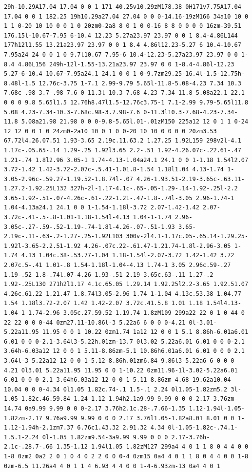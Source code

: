 \documentclass[11pt]{article}
\begin{document}
\begin{enumerate}
\begin{verbatim}
29h-10.29A17.04 17.04 0 0 1 171 40.25v10.29zM178.38 0H171v7.75A17.04 17.04 0 0 1 182.25 19h10.29a27.04 27.04 0 0 0-14.16-19zM166 34a10 10 0 1 1 0-20 10 10 0 0 1 0 20zm0-2a8 8 0 1 0 0-16 8 8 0 0 0 0 16zm-39.51 176.15l-10.67-7.95 6-10.4 12.23 5.27a23.97 23.97 0 0 1 8.4-4.86L144 177h12l1.55 13.21a23.97 23.97 0 0 1 8.4 4.86l12.23-5.27 6 10.4-10.67 7.95a24 24 0 0 1 0 9.7l10.67 7.95-6 10.4-12.23-5.27a23.97 23.97 0 0 1-8.4 4.86L156 249h-12l-1.55-13.21a23.97 23.97 0 0 1-8.4-4.86l-12.23 5.27-6-10.4 10.67-7.95a24.1 24.1 0 0 1 0-9.7zm29.25-16.4l-1.5-12.75h-8.48l-1.5 12.76c-3.75 1-7.1 2.99-9.79 5.65l-11.8-5.08-4.23 7.34 10.3 7.68c-.98 3.7-.98 7.6 0 11.3l-10.3 7.68 4.23 7.34 11.8-5.08a22.1 22.1 0 0 0 9.8 5.65l1.5 12.76h8.47l1.5-12.76c3.75-1 7.1-2.99 9.79-5.65l11.8 5.08 4.23-7.34-10.3-7.68c.98-3.7.98-7.6 0-11.3l10.3-7.68-4.23-7.34-11.8 5.08a21.98 21.98 0 0 0-9.8-5.65l.01-.01zM150 225a12 12 0 1 1 0-24 12 12 0 0 1 0 24zm0-2a10 10 0 1 0 0-20 10 10 0 0 0 0 20zm3.53 67.72l4.26.07.51 1.93-3.65 2.19c.11.63.2 1.27.25 1.92L159 298v2l-4.1 1.17c-.05.65-.14 1.29-.25 1.92l3.65 2.2-.51 1.92-4.26.07c-.22.61-.47 1.21-.74 1.8l2.96 3.05-1 1.74-4.13-1.04a24.1 24.1 0 0 1-1.18 1.54l2.07 3.72-1.42 1.42-3.72-2.07c-.5.41-1.01.8-1.54 1.18l1.04 4.13-1.74 1-3.05-2.96c-.59.27-1.19.52-1.8.74l-.07 4.26-1.93.51-2.19-3.65c-.63.11-1.27.2-1.92.25L132 327h-2l-1.17-4.1c-.65-.05-1.29-.14-1.92-.25l-2.2 3.65-1.92-.51-.07-4.26c-.61-.22-1.21-.47-1.8-.74l-3.05 2.96-1.74-1 1.04-4.13a24.1 24.1 0 0 1-1.54-1.18l-3.72 2.07-1.42-1.42 2.07-3.72c-.41-.5-.8-1.01-1.18-1.54l-4.13 1.04-1-1.74 2.96-3.05c-.27-.59-.52-1.19-.74-1.8l-4.26-.07-.51-1.93 3.65-2.19c-.11-.63-.2-1.27-.25-1.92L103 300v-2l4.1-1.17c.05-.65.14-1.29.25-1.92l-3.65-2.2.51-1.92 4.26-.07c.22-.61.47-1.21.74-1.8l-2.96-3.05 1-1.74 4.13 1.04c.38-.53.77-1.04 1.18-1.54l-2.07-3.72 1.42-1.42 3.72 2.07c.5-.41 1.01-.8 1.54-1.18l-1.04-4.13 1.74-1 3.05 2.96c.59-.27 1.19-.52 1.8-.74l.07-4.26 1.93-.51 2.19 3.65c.63-.11 1.27-.2 1.92-.25L130 271h2l1.17 4.1c.65.05 1.29.14 1.92.25l2.2-3.65 1.92.51.07 4.26c.61.22 1.21.47 1.8.74l3.05-2.96 1.74 1-1.04 4.13c.53.38 1.04.77 1.54 1.18l3.72-2.07 1.42 1.42-2.07 3.72c.41.5.8 1.01 1.18 1.54l4.13-1.04 1 1.74-2.96 3.05c.27.59.52 1.19.74 1.8zM109 299a22 22 0 1 0 44 0 22 22 0 0 0-44 0zm27.11-10.86l-3 5.22a6 6 0 0 0-4.21 0l-3.01-5.22a11.95 11.95 0 0 1 10.22 0zm1.74 1a12 12 0 0 1 5.1 8.86h-6.01a6.01 6.01 0 0 0-2.1-3.64l3-5.22h.01zm-13.7 0l3.02 5.22a6.01 6.01 0 0 0-2.1 3.64h-6.03a12 12 0 0 1 5.11-8.86zm-5.1 10.86h6.01a6.01 6.01 0 0 0 2.1 3.64l-3 5.22a12 12 0 0 1-5.12-8.86h.01zm6.84 9.86l3-5.22a6 6 0 0 0 4.21 0l3.01 5.22a11.95 11.95 0 0 1-10.22 0zm11.96-1l-3.02-5.22a6.01 6.01 0 0 0 2.1-3.64h6.03a12 12 0 0 1-5.11 8.86zm-4.68-19.62a10.04 10.04 0 0 0-4.34 0l1.05 1.82c.74-.1 1.5-.1 2.24 0l1.05-1.82zm5.2 3l-1.05 1.82c.46.59.84 1.24 1.12 1.94h2.1a9.99 9.99 0 0 0-2.17-3.76zm-14.74 0a9.99 9.99 0 0 0-2.17 3.76h2.1c.28-.7.66-1.35 1.12-1.94l-1.05-1.82zm-2.17 9.76a9.99 9.99 0 0 0 2.17 3.76l1.05-1.82a8.01 8.01 0 0 1-1.12-1.94h-2.1zm7.37 6.76c1.43.32 2.91.32 4.34 0l-1.05-1.82c-.74.1-1.5.1-2.24 0l-1.05 1.82zm9.54-3a9.99 9.99 0 0 0 2.17-3.76h-2.1c-.28.7-.66 1.35-1.12 1.94l1.05 1.82zM127 299a4 4 0 1 1 8 0 4 4 0 0 1-8 0zm2 0a2 2 0 1 0 4 0 2 2 0 0 0-4 0zm15 0a4 4 0 1 1 8 0 4 4 0 0 1-8 0zm-6.5 11.26a4 4 0 1 1 4 6.93 4 4 0 0 1-4-6.93zm-13 0a4 4 0 1 
\end{verbatim}
\end{enumerate}
\end{document}
